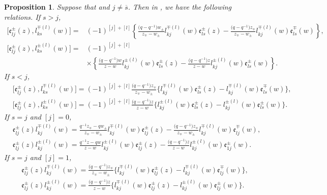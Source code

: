 \documentclass[pdftex]{sigma}
\numberwithin{equation}{section}
\newtheorem{Proposition}[Theorem]{Proposition}
 { \theoremstyle{definition}
\newtheorem{Definition}[Theorem]{Definition}
\newtheorem{Note}[Theorem]{Note}
\newtheorem{Example}[Theorem]{Example}
\newtheorem{Remark}[Theorem]{Remark} }
\begin{document}
\begin{Proposition}\label{pr3}
Suppose that  and $j\neq \overline{s}$. Then in , we have the following relations.
If $s>j$,
\begin{align}
\bigl[\mathfrak{e}_{lj}^{\pm}(z), l_{ks}^{\mp(l)}(w)\bigr]={}&(-1)^{[j]+[l]}\left\{\frac{\bigl(q-q^{-1}\bigr)w_{\pm}}{z_{\mp}-w_{\pm}}l_{kj}^{\mp(l)}(w)\mathfrak{e}_{ls}^{\pm}(z) -\frac{\bigl(q-q^{-1}\bigr)z_{\mp}}{z_{\mp}-w_{\pm}}l_{kj}^{\mp(l)}(w)\mathfrak{e}_{ls}^{\mp}(w)\right\},\nonumber\\
\bigl[\mathfrak{e}_{lj}^{\pm}(z), l_{ks}^{\pm(l)}(w)\bigr]={}&(-1)^{[j]+[l]}\nonumber\\
&\times\left\{\frac{\bigl(q-q^{-1}\bigr)w}{z-w}l_{kj}^{\pm(l)}(w)\mathfrak{e}_{ls}^{\pm}(z) -\frac{\bigl(q-q^{-1}\bigr)z}{z-w}l_{kj}^{\pm(l)}(w)\mathfrak{e}_{ls}^{\pm}(w)\right\}.\label{GS9}
\end{align}
If $s<j$,
\begin{align*}%
 &\bigl[\mathfrak{e}_{lj}^{\pm}(z), l_{ks}^{\mp(l)}(w)\bigr]=(-1)^{[j]+[l]}\frac{\bigl(q-q^{-1}\bigr)z_{\mp}}{z_{\mp}-w_{\pm}}\bigl\{l_{kj}^{\mp(l)}(w)\mathfrak{e}_{ls}^{\pm}(z) -l_{kj}^{\mp(l)}(w)\mathfrak{e}_{ls}^{\mp}(w)\bigr\},\\
 &\bigl[\mathfrak{e}_{lj}^{\pm}(z), l_{ks}^{\pm(l)}(w)\bigr]=(-1)^{[j]+[l]}\frac{\bigl(q-q^{-1}\bigr)z}{z-w}\bigl\{l_{kj}^{\pm(l)}(w)\mathfrak{e}_{ls}^{\pm}(z) -l_{kj}^{\pm(l)}(w)\mathfrak{e}_{ls}^{\pm}(w)\bigr\}.
\end{align*}
If $s=j$ and $[j]=0$,
\begin{align}
 &\mathfrak{e}_{lj}^{\pm}(z)l_{kj}^{\mp(l)}(w)=\frac{q^{-1}z_{\mp}-qw_{\pm}}{z_{\mp}-w_{\pm}}l_{kj}^{\mp(l)}(w)\mathfrak{e}_{lj}^{\pm}(z) -\frac{\bigl(q-q^{-1}\bigr)z_{\mp}}{z_{\mp}-w_{\pm}}l_{kj}^{\mp(l)}(w)\mathfrak{e}_{lj}^{\mp}(w),\nonumber\\
 &\mathfrak{e}_{lj}^{\pm}(z)l_{kj}^{\pm(l)}(w)=\frac{q^{-1}z-qw}{z-w}l_{kj}^{\pm(l)}(w)\mathfrak{e}_{lj}^{\pm}(z) -\frac{\bigl(q-q^{-1}\bigr)z}{z-w}l_{kj}^{\pm(l)}(w)\mathfrak{e}_{1j}^{\pm}(w).\label{GS11}
\end{align}
If $s=j$ and $[j]=1$,
\begin{align*}%
 &\mathfrak{e}_{lj}^{\pm}(z)l_{kj}^{\mp(l)}(w)=\frac{\bigl(q-q^{-1}\bigr)z_{\mp}}{z_{\mp}-w_{\pm}}\bigl\{l_{kj}^{\mp(l)}(w)\mathfrak{e}_{lj}^{\pm}(z) -l_{kj}^{\mp(l)}(w)\mathfrak{e}_{lj}^{\mp}(w)\bigr\},\\
 &\mathfrak{e}_{lj}^{\pm}(z)l_{kj}^{\pm(l)}(w)=\frac{\bigl(q-q^{-1}\bigr)z}{z-w}\bigl\{l_{kj}^{\mp(l)}(w)\mathfrak{e}_{lj}^{\pm}(z) -l_{kj}^{\pm(l)}(w)\mathfrak{e}_{lj}^{\pm}(w)\bigr\}.
\end{align*}
\end{Proposition}
\end{document}
